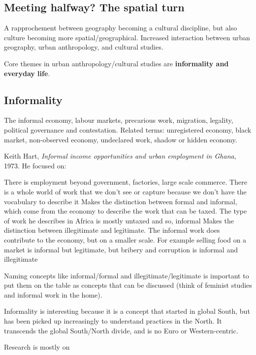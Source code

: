 \documentclass{article}
\begin{document}
\subsection{Meeting halfway? The spatial turn}

A rapprochement between geography becoming a cultural discipline, but also culture becoming more spatial/geographical.
Increased interaction between urban geography, urban anthropology, and cultural studies.

Core themes in urban anthropology/cultural studies are \textbf{informality and everyday life}.

\subsection{Informality}

The informal economy, labour markets, precarious work, migration, legality, political governance and contestation.
Related terms: unregistered economy, black market, non-observed economy, undeclared work, shadow or hidden economy.

Keith Hart, \textit{Informal income opportunities and urban employment in Ghana}, 1973. He focused on:

\begin{outline}
	\1 There is employment beyond government, factories, large scale commerce. There is a whole world of work that we don't see or capture because we don't have the vocabulary to describe it
	\1 Makes the distinction between formal and informal, which come from the economy to describe the work that can be taxed. The type of work he describes in Africa is mostly untaxed and so, informal
	\1 Makes the distinction between illegitimate and legitimate. The informal work does contribute to the economy, but on a smaller scale. For example selling food on a market is informal but legitimate, but bribery and corruption is informal and illegitimate
\end{outline}

Naming concepts like informal/formal and illegitimate/legitimate is important to put them on the table as concepts that can be discussed (think of feminist studies and informal work in the home).

Informality is interesting because it is a concept that started in global South, but has been picked up increasingly to understand practices in the North. It transcends the global South/North divide, and is no Euro or Western-centric.

Research is mostly on 
\end{document}
